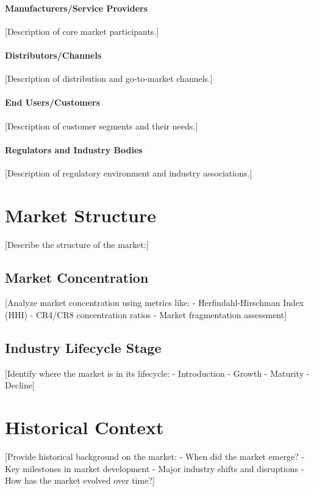 \documentclass[11pt,letterpaper]{report}
\begin{document}
\paragraph{Manufacturers/Service Providers}
[Description of core market participants.]

\paragraph{Distributors/Channels}
[Description of distribution and go-to-market channels.]

\paragraph{End Users/Customers}
[Description of customer segments and their needs.]

\paragraph{Regulators and Industry Bodies}
[Description of regulatory environment and industry associations.]

\section{Market Structure}


[Describe the structure of the market:]

\subsection{Market Concentration}

[Analyze market concentration using metrics like:
- Herfindahl-Hirschman Index (HHI)
- CR4/CR8 concentration ratios
- Market fragmentation assessment]

\subsection{Industry Lifecycle Stage}

[Identify where the market is in its lifecycle:
- Introduction
- Growth
- Maturity
- Decline]

\section{Historical Context}

[Provide historical background on the market:
- When did the market emerge?
- Key milestones in market development
- Major industry shifts and disruptions
- How has the market evolved over time?]
\end{document}
